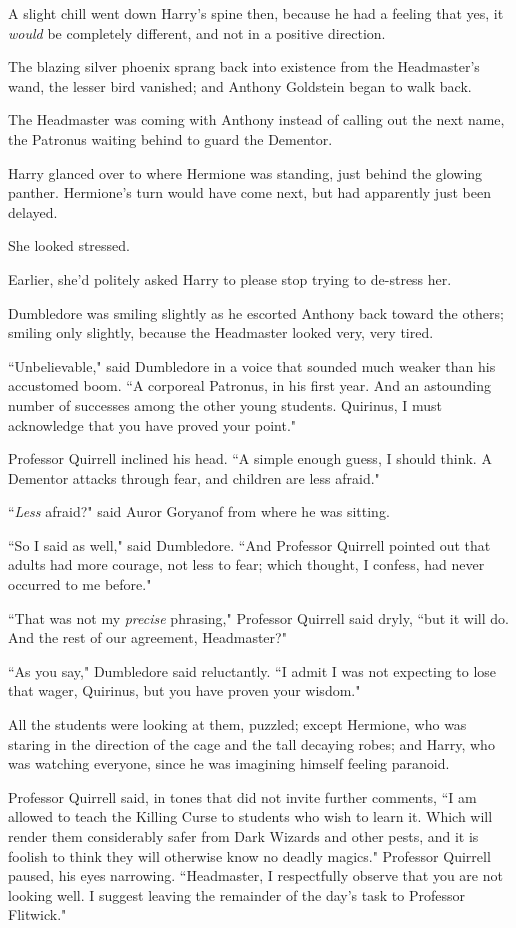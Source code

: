 A slight chill went down Harry's spine then, because he had a feeling that yes, it \emph{would} be completely different, and not in a positive direction.

The blazing silver phoenix sprang back into existence from the Headmaster's wand, the lesser bird vanished; and Anthony Goldstein began to walk back.

The Headmaster was coming with Anthony instead of calling out the next name, the Patronus waiting behind to guard the Dementor.

Harry glanced over to where Hermione was standing, just behind the glowing panther. Hermione's turn would have come next, but had apparently just been delayed.

She looked stressed.

Earlier, she'd politely asked Harry to please stop trying to de-stress her.

Dumbledore was smiling slightly as he escorted Anthony back toward the others; smiling only slightly, because the Headmaster looked very, very tired.

``Unbelievable," said Dumbledore in a voice that sounded much weaker than his accustomed boom. ``A corporeal Patronus, in his first year. And an astounding number of successes among the other young students. Quirinus, I must acknowledge that you have proved your point."

Professor Quirrell inclined his head. ``A simple enough guess, I should think. A Dementor attacks through fear, and children are less afraid."

``\emph{Less} afraid?" said Auror Goryanof from where he was sitting.

``So I said as well," said Dumbledore. ``And Professor Quirrell pointed out that adults had more courage, not less to fear; which thought, I confess, had never occurred to me before."

``That was not my \emph{precise} phrasing," Professor Quirrell said dryly, ``but it will do. And the rest of our agreement, Headmaster?"

``As you say," Dumbledore said reluctantly. ``I admit I was not expecting to lose that wager, Quirinus, but you have proven your wisdom."

All the students were looking at them, puzzled; except Hermione, who was staring in the direction of the cage and the tall decaying robes; and Harry, who was watching everyone, since he was imagining himself feeling paranoid.

Professor Quirrell said, in tones that did not invite further comments, ``I am allowed to teach the Killing Curse to students who wish to learn it. Which will render them considerably safer from Dark Wizards and other pests, and it is foolish to think they will otherwise know no deadly magics." Professor Quirrell paused, his eyes narrowing. ``Headmaster, I respectfully observe that you are not looking well. I suggest leaving the remainder of the day's task to Professor Flitwick."

